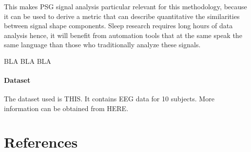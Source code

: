\documentclass[review]{elsarticle}
\begin{document}
This makes PSG signal analysis particular relevant for this methodology, because it can be used to derive a metric that can describe quantitative the similarities between signal shape components.  Sleep research requires long hours of data analysis hence, it will benefit from automation tools that at the same speak the same language than those who traditionally analyze these signals.

BLA BLA BLA

\paragraph{Dataset}

The dataset used is THIS.  It contains EEG data for 10 subjects.  More information can be obtained from HERE.


\section*{References}


\end{document}
